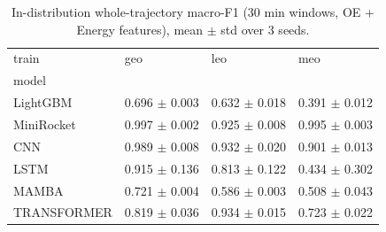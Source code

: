 \begin{table}
\caption{In-distribution whole-trajectory macro-F1 (30 min windows, OE + Energy features), mean $\pm$ std over 3 seeds.}
\label{tab:total_main}
\begin{tabular}{llll}
\toprule
train & geo & leo & meo \\
model &  &  &  \\
\midrule
LightGBM & 0.696 $\pm$ 0.003 & 0.632 $\pm$ 0.018 & 0.391 $\pm$ 0.012 \\
MiniRocket & 0.997 $\pm$ 0.002 & 0.925 $\pm$ 0.008 & 0.995 $\pm$ 0.003 \\
CNN & 0.989 $\pm$ 0.008 & 0.932 $\pm$ 0.020 & 0.901 $\pm$ 0.013 \\
LSTM & 0.915 $\pm$ 0.136 & 0.813 $\pm$ 0.122 & 0.434 $\pm$ 0.302 \\
MAMBA & 0.721 $\pm$ 0.004 & 0.586 $\pm$ 0.003 & 0.508 $\pm$ 0.043 \\
TRANSFORMER & 0.819 $\pm$ 0.036 & 0.934 $\pm$ 0.015 & 0.723 $\pm$ 0.022 \\
\bottomrule
\end{tabular}
\end{table}
